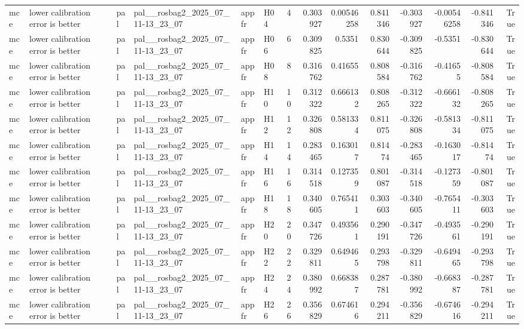 \begin{longtable}{llllllrrrrrrrr}
mce & lower calibration error is better & pal & pal\_\_rosbag2\_2025\_07\_11-13\_23\_07 & appfr & H04 & 4 & 0.303927 & 0.00546258 & 0.841346 & -0.303927 & -0.00546258 & -0.841346 & True \\
mce & lower calibration error is better & pal & pal\_\_rosbag2\_2025\_07\_11-13\_23\_07 & appfr & H06 & 6 & 0.309825 & 0.5351 & 0.830644 & -0.309825 & -0.5351 & -0.830644 & True \\
mce & lower calibration error is better & pal & pal\_\_rosbag2\_2025\_07\_11-13\_23\_07 & appfr & H08 & 8 & 0.316762 & 0.41655 & 0.808584 & -0.316762 & -0.41655 & -0.808584 & True \\
mce & lower calibration error is better & pal & pal\_\_rosbag2\_2025\_07\_11-13\_23\_07 & appfr & H10 & 10 & 0.312322 & 0.666132 & 0.808265 & -0.312322 & -0.666132 & -0.808265 & True \\
mce & lower calibration error is better & pal & pal\_\_rosbag2\_2025\_07\_11-13\_23\_07 & appfr & H12 & 12 & 0.326808 & 0.581334 & 0.811075 & -0.326808 & -0.581334 & -0.811075 & True \\
mce & lower calibration error is better & pal & pal\_\_rosbag2\_2025\_07\_11-13\_23\_07 & appfr & H14 & 14 & 0.283465 & 0.163017 & 0.81474 & -0.283465 & -0.163017 & -0.81474 & True \\
mce & lower calibration error is better & pal & pal\_\_rosbag2\_2025\_07\_11-13\_23\_07 & appfr & H16 & 16 & 0.314518 & 0.127359 & 0.801087 & -0.314518 & -0.127359 & -0.801087 & True \\
mce & lower calibration error is better & pal & pal\_\_rosbag2\_2025\_07\_11-13\_23\_07 & appfr & H18 & 18 & 0.340605 & 0.765411 & 0.303603 & -0.340605 & -0.765411 & -0.303603 & True \\
mce & lower calibration error is better & pal & pal\_\_rosbag2\_2025\_07\_11-13\_23\_07 & appfr & H20 & 20 & 0.347726 & 0.493561 & 0.290191 & -0.347726 & -0.493561 & -0.290191 & True \\
mce & lower calibration error is better & pal & pal\_\_rosbag2\_2025\_07\_11-13\_23\_07 & appfr & H22 & 22 & 0.329811 & 0.649465 & 0.293798 & -0.329811 & -0.649465 & -0.293798 & True \\
mce & lower calibration error is better & pal & pal\_\_rosbag2\_2025\_07\_11-13\_23\_07 & appfr & H24 & 24 & 0.380992 & 0.668387 & 0.287781 & -0.380992 & -0.668387 & -0.287781 & True \\
mce & lower calibration error is better & pal & pal\_\_rosbag2\_2025\_07\_11-13\_23\_07 & appfr & H26 & 26 & 0.356829 & 0.674616 & 0.294211 & -0.356829 & -0.674616 & -0.294211 & True \\

\end{longtable}
